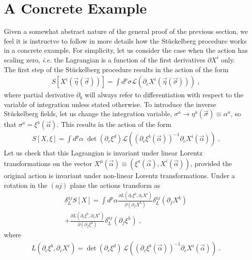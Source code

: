 \documentclass[%
 reprint,
 amsmath,amssymb,
 aps,
]{revtex4-1}
\begin{document}
\section{A Concrete Example}
Given a somewhat abstract nature of the general proof of the previous section, we feel it is instructve to follow in more details
 how the St\"uckelberg procedure works in a concrete example. For simplicity, let us consider the case when the action has scaling zero,
 {\it i.e.} the Lagrangian is a function of the first derivatives $\partial X^i$ only. The first step of the St\"uckelberg procedure results in the action of the form
\begin{eqnarray}
     S[X^i(\vec{\eta}(\vec{\sigma}))] = \int d^p \sigma \mathcal{L}
     (\partial_c X^i (\vec{\eta}(\vec{\sigma}))) \; , \nonumber
\end{eqnarray}
where partial derivative $\partial_b$ will always refer to differentiation with respect to the variable of integration
unless stated otherwise.  To introduce the inverse St\"uckelberg fields, let us change the integration variable,
 $\sigma^a \rightarrow \eta^a(\vec{\sigma}) \equiv \alpha^a$, so that
$\sigma^a = \xi^a(\vec{\alpha})$. This results in the action of the form
\begin{eqnarray}
  S[X,\xi]  = \int d^p \alpha\;
   \mathrm{\det}\left({\partial_e \xi^d} \right)
    \mathcal{L}\left( \left({\partial_c \xi^b(\vec{\alpha})} \right)^{-1}
   {\partial_c X^i(\vec{\alpha})} \right)
     \; . \nonumber
\end{eqnarray}
Let us check that this Lagrangian is invariant under linear Lorentz
transformations on the vector $X^{\mu}(\vec{\alpha}) \equiv (\xi^a(\vec{\alpha}), X^i(\vec{\alpha}))$, provided the original  action is invariant
under non-linear Lorentz transformations.
 Under  a rotation
in the $(aj)$ plane the actions transform as
\begin{gather}
\label{Lvariation}
    \delta^{a j}_{L}S[X] =
    \int d^p \alpha \frac{\partial L(\partial_c \xi^b, \partial_c X^i)}{\partial(\partial_f X^k)}
    \delta^{a j}_{L} (\partial_f X^k)  \\
    + \frac{\partial L(\partial_c \xi^b, \partial_c X^i)}{\partial(\partial_f \xi^h)}
    \delta^{a j}_{L} (\partial_f \xi^h) \nonumber\;,
\end{gather}
where
\begin{eqnarray}
    L(\partial_c \xi^b, \partial_c X^i) = \mathrm{\det}( \partial_e \xi^d )
    \, \mathcal{L}( ( \partial_c \xi^b(\vec{\alpha}) )^{-1}
    \partial_c X^i(\vec{\alpha}) )\;.  \nonumber
\end{eqnarray}
\end{document}
